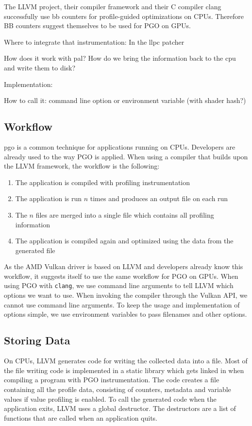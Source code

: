 \clearpage
{}
The LLVM project, their compiler framework and their C compiler clang successfully use \gls{bb} counters for profile-guided optimizations on CPUs. Therefore BB counters suggest themselves to be used for PGO on GPUs.

Where to integrate that instrumentation: In the llpc patcher

How does it work with pal?
How do we bring the information back to the cpu and write them to disk?

Implementation:

How to call it: command line option or environment variable (with shader hash?)

\subsection{Workflow}
\label{sub:workflow}
\Gls{pgo} is a common technique for applications running on CPUs.
Developers are already used to the way PGO is applied.
When using a compiler that builds upon the LLVM framework, the workflow is the following:
\begin{enumerate}
	\item The application is compiled with profiling instrumentation
	\item The application is run $n$ times and produces an output file on each run
	\item The $n$ files are merged into a single file which contains all profiling information
	\item The application is compiled again and optimized using the data from the generated file
\end{enumerate}
As the AMD Vulkan driver is based on LLVM and developers already know this workflow, it suggests itself to use the same workflow for PGO on GPUs.
When using PGO with \texttt{clang}, we use command line arguments to tell LLVM which options we want to use. When invoking the compiler through the Vulkan API, we cannot use command line arguments.
To keep the usage and implementation of options simple, we use environment variables to pass filenames and other options.

\subsection{Storing Data}
\label{sub:save-design}
On CPUs, LLVM generates code for writing the collected data into a file.
Most of the file writing code is implemented in a static library which gets linked in when compiling a program with PGO instrumentation.
The code creates a file containing all the profile data, consisting of counters, metadata and variable values if value profiling is enabled.
To call the generated code when the application exits, LLVM uses a global destructor.
The destructors are a list of functions that are called when an application quits.

